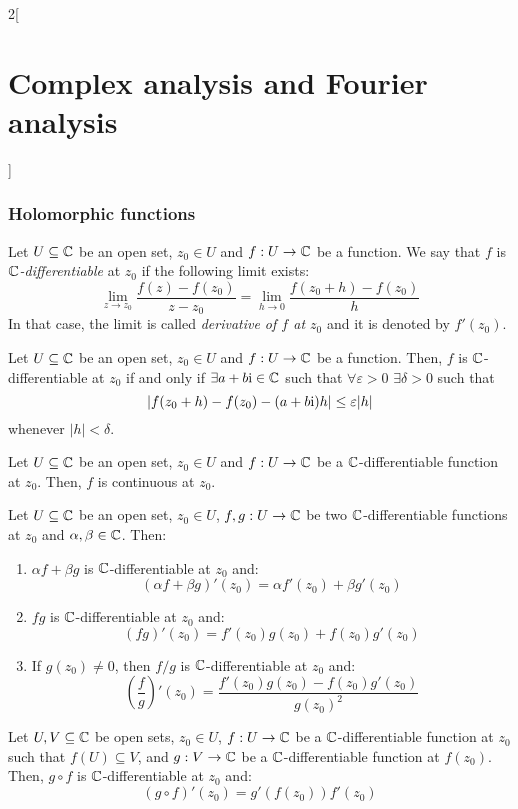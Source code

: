 \documentclass[../../../main.tex]{subfiles}
\begin{document}
\begin{multicols}{2}[\section{Complex analysis and Fourier analysis}]
  \subsubsection{Holomorphic functions}
  \begin{definition}
    Let $U\subseteq \mathbb{C}$ be an open set, $z_0\in U$ and $f:U\rightarrow \mathbb{C}$ be a function. We say that $f$ is \emph{$\mathbb{C}$-differentiable} at $z_0$ if the following limit exists: $$\lim_{z \to z_0} \frac{f(z) - f(z_0)}{z - z_0} = \lim_{h \to 0} \frac{f(z_0 + h) - f(z_0)}{h}$$ In that case, the limit is called \textit{derivative of $f$ at $z_0$} and it is denoted by $f'(z_0)$.
  \end{definition}
  \begin{proposition}
    Let $U\subseteq \mathbb{C}$ be an open set, $z_0\in U$ and $f:U\rightarrow \mathbb{C}$ be a function. Then, $f$ is $\mathbb{C}$-differentiable at $z_0$ if and only if $\exists a+b\mathrm{i}\in\mathbb{C}$ such that $\forall\varepsilon>0$ $\exists\delta>0$ such that $$|f(z_0+h)-f(z_0)-(a+b\mathrm{i})h|\leq \varepsilon \abs{h}$$ whenever $|h|<\delta$.
  \end{proposition}
  \begin{proposition}
    Let $U\subseteq \mathbb{C}$ be an open set, $z_0 \in U$ and $f:U\rightarrow \mathbb{C}$ be a $\mathbb{C}$-differentiable function at $z_0$. Then, $f$ is continuous at $z_0$.
  \end{proposition}
  \begin{proposition}
    Let $U\subseteq \mathbb{C}$ be an open set, $z_0 \in U$, $f,g:U\rightarrow \mathbb{C}$ be two $\mathbb{C}$-differentiable functions at $z_0$ and $\alpha,\beta\in \mathbb{C}$. Then:
    \begin{enumerate}
      \item $\alpha f + \beta g$ is $\mathbb{C}$-differentiable at $z_0$ and: $${(\alpha f+ \beta g)}'(z_0) = \alpha f'(z_0) + \beta g'(z_0)$$
      \item $fg$ is $\mathbb{C}$-differentiable at $z_0$ and: $${(fg)}'(z_0) = f'(z_0)g(z_0) + f(z_0)g'(z_0)$$
      \item If $g(z_0) \neq 0$, then $f/g$ is $\mathbb{C}$-differentiable at $z_0$ and:
            $${\left(\frac{f}{g}\right)}'(z_0) = \frac{f'(z_0)g(z_0) - f(z_0) g'(z_0)}{{g(z_0)}^2}$$
    \end{enumerate}
  \end{proposition}
  \begin{theorem}
    Let $U,V\subseteq \mathbb{C}$ be open sets, $z_0\in U$, $f:U\rightarrow\mathbb{C}$ be a $\mathbb{C}$-differentiable function at $z_0$ such that $f(U)\subseteq V$, and $g:V\rightarrow\mathbb{C}$ be a $\mathbb{C}$-differentiable function at $f(z_0)$. Then, $g\circ f$ is $\mathbb{C}$-differentiable at $z_0$ and: $${(g\circ f)}'(z_0)=g'(f(z_0))f'(z_0)$$

\end{theorem}
\end{multicols}
\end{document}
